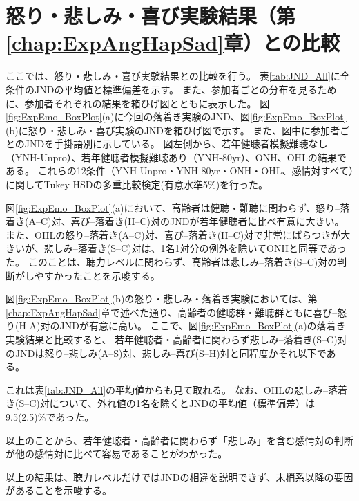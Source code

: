 





\clearpage
\section{怒り・悲しみ・喜び実験結果（第\ref{chap:ExpAngHapSad}章）との比較}
ここでは、怒り・悲しみ・喜び実験結果との比較を行う。
表\ref{tab:JND_All}に全条件のJNDの平均値と標準偏差を示す。
また、参加者ごとの分布を見るために、参加者それぞれの結果を箱ひげ図とともに表示した。
図\ref{fig:ExpEmo_BoxPlot}(a)に今回の落着き実験のJND、図\ref{fig:ExpEmo_BoxPlot}(b)に怒り・悲しみ・喜び実験のJNDを箱ひげ図で示す。
また、図中に参加者ごとのJNDを手掛語別に示している。
図左側から、若年健聴者模擬難聴なし（YNH-Unpro）、若年健聴者模擬難聴あり（YNH-80yr）、ONH、OHLの結果である。
これらの12条件（YNH-Unpro・YNH-80yr・ONH・OHL、感情対すべて）に関してTukey HSDの多重比較検定(有意水準5\%)を行った。

図\ref{fig:ExpEmo_BoxPlot}(a)において、高齢者は健聴・難聴に関わらず、怒り--落着き(A--C)対、喜び--落着き(H--C)対のJNDが若年健聴者に比べ有意に大きい。
また、OHLの怒り--落着き(A--C)対、喜び--落着き(H--C)対で非常にばらつきが大きいが、悲しみ--落着き(S--C)対は、1名1対分の例外を除いてONHと同等であった。
このことは、聴力レベルに関わらず、高齢者は悲しみ--落着き(S--C)対の判断がしやすかったことを示唆する。

図\ref{fig:ExpEmo_BoxPlot}(b)の怒り・悲しみ・落着き実験においては、第\ref{chap:ExpAngHapSad}章で述べた通り、高齢者の健聴群・難聴群ともに喜び--怒り(H-A)対のJNDが有意に高い。
ここで、図\ref{fig:ExpEmo_BoxPlot}(a)の落着き実験結果と比較すると、
若年健聴者・高齢者に関わらず悲しみ--落着き(S--C)対のJNDは怒り--悲しみ(A--S)対、悲しみ--喜び(S--H)対と同程度かそれ以下である。

これは表\ref{tab:JND_All}の平均値からも見て取れる。
なお、OHLの悲しみ--落着き(S--C)対について、外れ値の1名を除くとJNDの平均値（標準偏差）は9.5(2.5)\%であった。

以上のことから、若年健聴者・高齢者に関わらず「悲しみ」を含む感情対の判断が他の感情対に比べて容易であることがわかった。

以上の結果は、聴力レベルだけではJNDの相違を説明できず、末梢系以降の要因があることを示唆する。



